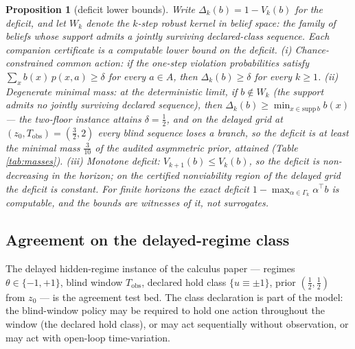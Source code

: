 \documentclass[10pt,twocolumn]{article}
\theoremstyle{plain}
\newtheorem{proposition}[theorem]{Proposition}
\theoremstyle{definition}
\theoremstyle{remark}
\begin{document}
\begin{proposition}[deficit lower bounds]\label{prop:deficit}
Write \(\Delta_{k}(b) = 1 - V_{k}(b)\) for the deficit, and let \(W_{k}\)
denote the \(k\)-step robust kernel in belief space: the family of beliefs
whose support admits a jointly surviving declared-class sequence. Each
companion certificate is a computable lower bound on the deficit.
(i) \emph{Chance-constrained common action:} if the one-step violation
probabilities satisfy \(\sum_{x} b(x)\, p(x, a) \ge \delta\) for every
\(a \in A\), then \(\Delta_{k}(b) \ge \delta\) for every \(k \ge 1\).
(ii) \emph{Degenerate minimal mass:} at the deterministic limit, if
\(b \notin W_{k}\) (the support admits no jointly surviving declared
sequence), then \(\Delta_{k}(b) \ge \min_{x \in \mathrm{supp}\, b} b(x)\)
--- the two-floor instance attains \(\delta = \tfrac{1}{2}\), and on the
delayed grid at \((z_{0}, T_{\mathrm{obs}}) = (\tfrac{3}{2}, 2)\) every
blind sequence loses a branch, so the deficit is at least the minimal
mass \(\tfrac{3}{10}\) of the audited asymmetric prior, attained
(Table \ref{tab:masses}).
(iii) \emph{Monotone deficit:} \(V_{k+1}(b) \le V_{k}(b)\), so the
deficit is non-decreasing in the horizon; on the certified nonviability
region of the delayed grid the deficit is constant.
For finite horizons the exact deficit
\(1 - \max_{\alpha \in \Gamma_{k}} \alpha^{\top} b\) is computable, and
the bounds are witnesses of it, not surrogates.
\end{proposition}

\subsection{Agreement on the delayed-regime class}\label{agreement}

The delayed hidden-regime instance of the calculus paper --- regimes
\(\theta \in \{-1, +1\}\), blind window \(T_{\mathrm{obs}}\), declared
hold class \(\{u \equiv \pm 1\}\), prior \((\tfrac12, \tfrac12)\) from
\(z_{0}\) --- is the agreement test bed. The class declaration is part of
the model: the blind-window policy may be required to hold one action
throughout the window (the declared hold class), or may act sequentially
without observation, or may act with open-loop time-variation.
\end{document}

